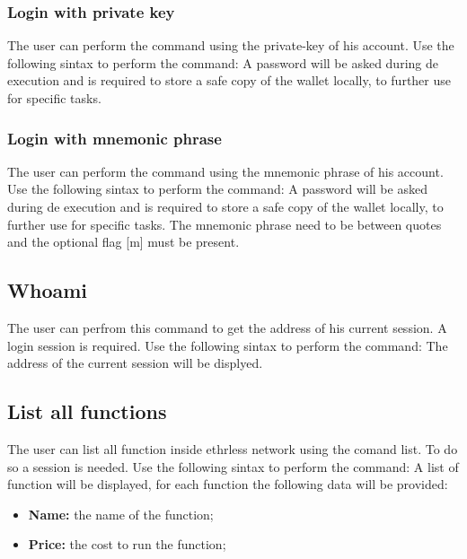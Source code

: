 \subsubsection{Login with private key}
The user can perform the command using the private-key of his account. Use the following sintax to perform the command:
\newline A password will be asked during de execution and is required to store a safe copy of the wallet locally, to further use for specific tasks.

\subsubsection{Login with mnemonic phrase}
The user can perform the command using the mnemonic phrase of his account. Use the following sintax to perform the command:
\newline A password will be asked during de execution and is required to store a safe copy of the wallet locally, to further use for specific tasks.
\newline The mnemonic phrase need to be between quotes and the optional flag [m] must be present.

\subsection{Whoami}
The user can perfrom this command to get the address of his current session. A login session is required.
Use the following sintax to perform the command:
\newline The address of the current session will be displyed.

\subsection{List all functions}
The user can list all function inside ethrless network using the comand list. To do so a session is needed.
Use the following sintax to perform the command:
\newline A list of function will be displayed, for each function the following data will be provided:
\begin{itemize}
	\item \textbf{Name: } the name of the function; 
	\item \textbf{Price: } the cost to run the function; 
\end{itemize}

